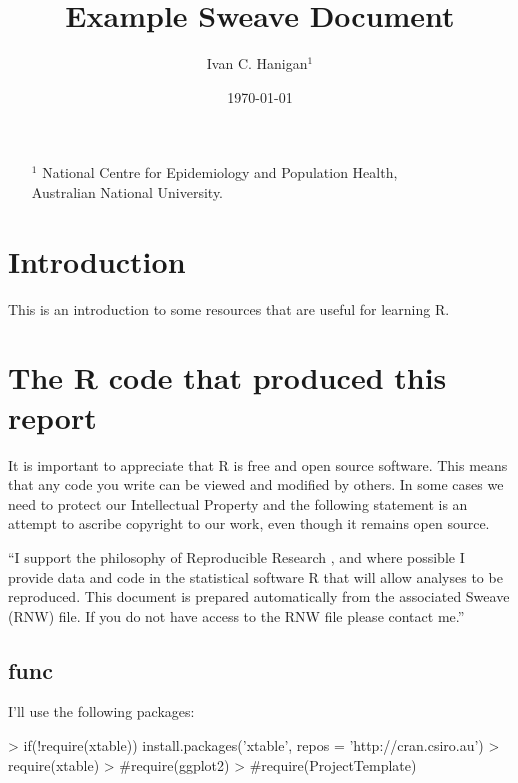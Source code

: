 \documentclass[a4paper]{article}
\begin{document}

%
\title{Example Sweave Document}
\author{Ivan C. Hanigan$^{1}$}
\date {\today}
\maketitle
\begin{itemize}
\item [$^1$] National Centre for Epidemiology and Population Health, \\Australian National University.
\end{itemize}

\setcounter{page}{1}
\tableofcontents 
{}
\setcounter{page}{1}

\section{Introduction}
This is an introduction to some resources that are useful for learning R.  
\section{The R code that produced this report}
It is important to appreciate that R is free and open source software.  This means that any code you write can be viewed and modified by others.  In some cases we need to protect our Intellectual Property and the following statement is an attempt to ascribe copyright to our work, even though it remains open source.

``I support the philosophy of Reproducible Research \cite{Peng2011}, and where possible I provide data and code in the statistical software R that will allow analyses to be reproduced.  This document is prepared automatically from the associated Sweave (RNW) file.  If you do not have access to the RNW file please contact me.''


\subsection{func}
I'll use the following packages:
\begin{Schunk}
\begin{Sinput}
> if(!require(xtable)) install.packages('xtable', repos = 'http://cran.csiro.au')
> require(xtable)
> #require(ggplot2)
> #require(ProjectTemplate)
\end{Sinput}
\end{Schunk}
\end{document}
